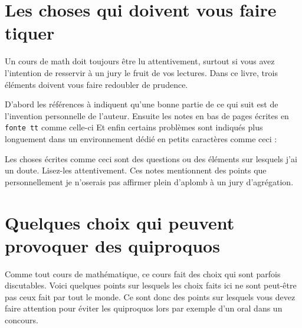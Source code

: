 \section{Les choses qui doivent vous faire tiquer}

Un cours de math doit toujours être lu attentivement, surtout si vous avez l'intention de resservir à un jury le fruit de vos lectures. Dans ce livre, trois éléments doivent vous faire redoubler de prudence.

D'abord les références à \cite{MonCerveau} indiquent qu'une bonne partie de ce qui suit est de l'invention personnelle de l'auteur. Ensuite les notes en bas de pages écrites en \texttt{fonte tt} comme celle-ci Et enfin certains problèmes sont indiqués plus longuement dans un environnement dédié en petits caractères comme ceci :
\begin{probleme}
    Les choses écrites comme ceci sont des questions ou des éléments sur lesquels j'ai un doute. Lisez-les attentivement. Ces notes mentionnent des points que personnellement je n'oserais pas affirmer plein d'aplomb à un jury d'agrégation.
\end{probleme}

\section{Quelques choix qui peuvent provoquer des quiproquos}

Comme tout cours de mathématique, ce cours fait des choix qui sont parfois discutables. Voici quelques points sur lesquels les choix faits ici ne sont peut-être pas ceux fait par tout le monde. Ce sont donc des points sur lesquels vous devez faire attention pour éviter les quiproquos lors par exemple d'un oral dans un concours.

